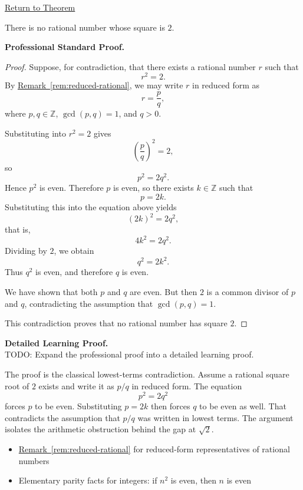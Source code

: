 \newpage
{}
\label{prf:sqrt2-irrational}

\begin{remark*}[Return]
\hyperref[thm:sqrt2-irrational]{Return to Theorem}
\end{remark*}

\begin{theorem*}
There is no rational number whose square is $2$.
\end{theorem*}

\textbf{Professional Standard Proof.}~\\
\begin{proof}
Suppose, for contradiction, that there exists a rational number $r$ such that
\[
r^2=2.
\]
By \hyperref[rem:reduced-rational]{Remark~\ref*{rem:reduced-rational}}, we may
write $r$ in reduced form as
\[
r=\frac{p}{q},
\]
where $p,q\in\mathbb{Z}$, $\gcd(p,q)=1$, and $q>0$.

Substituting into $r^2=2$ gives
\[
\left(\frac{p}{q}\right)^2=2,
\]
so
\[
p^2=2q^2.
\]
Hence $p^2$ is even. Therefore $p$ is even, so there exists $k\in\mathbb{Z}$
such that
\[
p=2k.
\]
Substituting this into the equation above yields
\[
(2k)^2=2q^2,
\]
that is,
\[
4k^2=2q^2.
\]
Dividing by $2$, we obtain
\[
q^2=2k^2.
\]
Thus $q^2$ is even, and therefore $q$ is even.

We have shown that both $p$ and $q$ are even. But then $2$ is a common divisor
of $p$ and $q$, contradicting the assumption that $\gcd(p,q)=1$.

This contradiction proves that no rational number has square $2$.
\end{proof}

\textbf{Detailed Learning Proof.}~\\
TODO: Expand the professional proof into a detailed learning proof.


\begin{remark*}
The proof is the classical lowest-terms contradiction. Assume a rational square
root of $2$ exists and write it as $p/q$ in reduced form. The equation
\[
p^2=2q^2
\]
forces $p$ to be even. Substituting $p=2k$ then forces $q$ to be even as well.
That contradicts the assumption that $p/q$ was written in lowest terms. The
argument isolates the arithmetic obstruction behind the gap at $\sqrt{2}$.
\end{remark*}

\begin{dependencies}
\begin{itemize}
  \item \hyperref[rem:reduced-rational]{Remark~\ref*{rem:reduced-rational}} for reduced-form representatives of rational numbers
  \item Elementary parity facts for integers: if $n^2$ is even, then $n$ is even
\end{itemize}
\end{dependencies}

